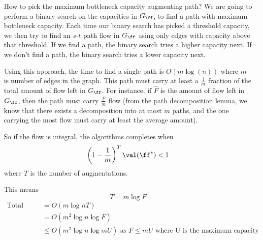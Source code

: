 How to pick the maximum bottleneck capacity augmenting path? We are
going to perform a binary search on the capacities in \(G_{\ff}\), to
find a path with maximum bottleneck capacity.
Each time our binary search has picked a threshold capacity, we then
try to find an $s$-$t$ path flow in \(G_{\ff}\) using only  edges with
capacity above that threshold. If we find a path, the binary search
tries a higher capacity next. If we don't find a path, the binary search
tries a lower capacity next.

Using this approach, the time to find a single path is $O(m \log(n))$ where $m$ is number of edges in the graph.
This path must carry at least a \( \frac{1}{m}\) fraction of the total
amount of flow left in \(G_{\ff}\). For instance, if \(\hat{F}\) is
the amount of flow left in \(G_{\ff}\), then the path must carry
\(\frac{\hat{F}}{m}\) flow (from the path decomposition lemma, 
we know that there exists a decomposition into at most $m$ paths, 
and the one carrying the most flow must carry
at least the average amount).

So if the flow is integral, the algorithms completes when
\begin{equation}\nonumber
    \left( 1 - \frac{1}{m}\right)^T \val(\ff^*) < 1
\end{equation}
where $T$ is the number of augmentations.

This means
\begin{equation}\nonumber
    T = m \log{F}
\end{equation}
\begin{align*}
\text{Total time} &= O(m \log{n} T) \\
                  &= O(m^2 \log{n} \log{F})\\
                  &\leq O(m^2 \log{n} \log{mU}) \text { as }  F \leq m U \text{ where U is the maximum capacity}\\
\end{align*}

